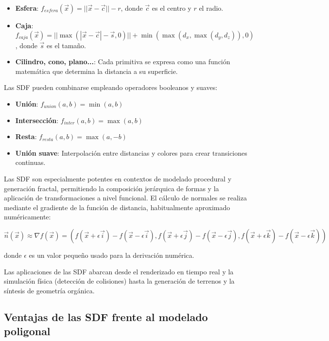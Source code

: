 \begin{itemize}
    \item \textbf{Esfera}: $f_{esfera}(\vec{x}) = ||\vec{x} - \vec{c}|| - r$, donde $\vec{c}$ es el centro y $r$ el radio.
    \item \textbf{Caja}: $f_{caja}(\vec{x}) = ||\max(|\vec{x} - \vec{c}| - \vec{s}, 0)|| + \min(\max(d_x, \max(d_y, d_z)), 0)$, donde $\vec{s}$ es el tamaño.
    \item \textbf{Cilindro, cono, plano...}: Cada primitiva se expresa como una función matemática que determina la distancia a su superficie.
\end{itemize}

Las SDF pueden combinarse empleando operadores booleanos y suaves:

\begin{itemize}
    \item \textbf{Unión}: $f_{union}(a, b) = \min(a, b)$
    \item \textbf{Intersección}: $f_{inter}(a, b) = \max(a, b)$
    \item \textbf{Resta}: $f_{resta}(a, b) = \max(a, -b)$
    \item \textbf{Unión suave}: Interpolación entre distancias y colores para crear transiciones continuas.
\end{itemize}

Las SDF son especialmente potentes en contextos de modelado procedural y
generación fractal, permitiendo la composición jerárquica de formas y la
aplicación de transformaciones a nivel funcional. El cálculo de normales se
realiza mediante el gradiente de la función de distancia, habitualmente
aproximado numéricamente:

\begin{equation}
    \vec{n}(\vec{x}) \approx \nabla f(\vec{x}) = \left(
    f(\vec{x} + \epsilon \vec{i}) - f(\vec{x} - \epsilon \vec{i}),
    f(\vec{x} + \epsilon \vec{j}) - f(\vec{x} - \epsilon \vec{j}),
    f(\vec{x} + \epsilon \vec{k}) - f(\vec{x} - \epsilon \vec{k})
    \right)
\end{equation}

donde $\epsilon$ es un valor pequeño usado para la derivación numérica.

Las aplicaciones de las SDF abarcan desde el renderizado en tiempo real y la
simulación física (detección de colisiones) hasta la generación de terrenos y
la síntesis de geometría orgánica.

\subsection{Ventajas de las SDF frente al modelado poligonal}

